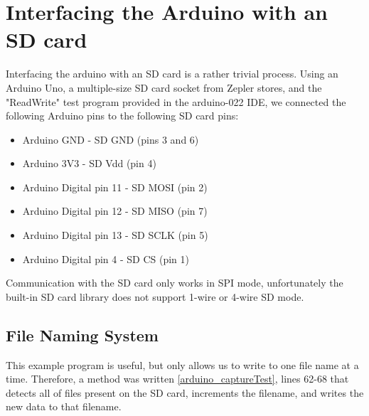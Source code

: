 \section{Interfacing the Arduino with an SD card}

Interfacing the arduino with an SD card is a rather trivial process. Using an Arduino Uno, a multiple-size SD card socket from Zepler stores, and the 
"ReadWrite" test program provided in the arduino-022 IDE, we connected the following Arduino pins to the following SD card pins:

\begin{itemize}
\item Arduino GND - SD GND (pins 3 and 6)
\item Arduino 3V3 - SD Vdd (pin 4)
\item Arduino Digital pin 11 - SD MOSI (pin 2)
\item Arduino Digital pin 12 - SD MISO (pin 7)
\item Arduino Digital pin 13 - SD SCLK (pin 5)
\item Arduino Digital pin 4 - SD CS (pin 1)
\end{itemize}

Communication with the SD card only works in SPI mode, unfortunately the built-in 
SD card library does not support 1-wire or 4-wire SD mode.

\subsection{File Naming System}

This example program is useful, but only allows us to write to one file name at 
a time. Therefore, a method was written \ref{arduino_captureTest}, lines 62-68 that detects all of files present on the SD card, increments the filename, and 
writes the new data to that filename.
